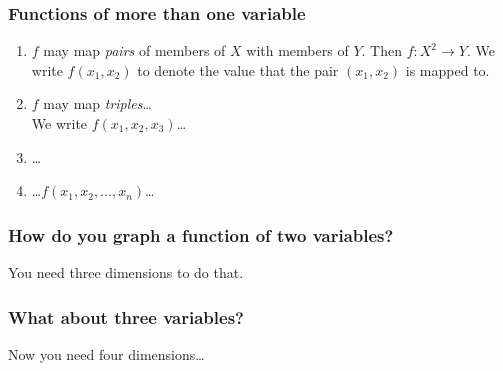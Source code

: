 \documentclass[xcolor=pdftex,dvipsnames]{beamer}
\begin{document}
\begin{frame}
\frametitle{Functions of more than one variable}

\begin{enumerate}[<+->]
\item $f$ may map \emph{pairs} of members of $X$ with members of
  $Y$. Then $f:X^2\to Y$. We write $f(x_1,x_2)$ to denote the value
  that the pair $(x_1,x_2)$ is mapped to.
\item $f$ may map \emph{triples}\dots\\
We write $f(x_1,x_2,x_3)$\dots
\item \dots
\item \dots $f(x_1,x_2,\dots,x_n)$\dots
\end{enumerate}
\end{frame}

\begin{frame}
\frametitle{How do you graph a function of two variables?}
You need three dimensions to do that.

\end{frame}

\begin{frame}
\frametitle{What about three variables?}
Now you need four dimensions\dots
\end{frame}
\end{document}
